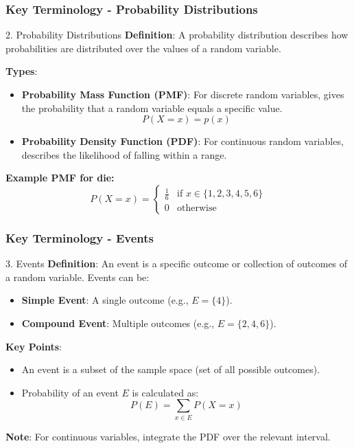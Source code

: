 \documentclass[aspectratio=169]{beamer}
\begin{document}
\begin{frame}[fragile]
  \frametitle{Key Terminology - Probability Distributions}
  \begin{block}{2. Probability Distributions}
    \textbf{Definition}: A probability distribution describes how probabilities are distributed over the values of a random variable.
  
    \textbf{Types}:
    \begin{itemize}
      \item \textbf{Probability Mass Function (PMF)}: For discrete random variables, gives the probability that a random variable equals a specific value.
      \begin{equation}
        P(X = x) = p(x)
      \end{equation}
      \item \textbf{Probability Density Function (PDF)}: For continuous random variables, describes the likelihood of falling within a range.
    \end{itemize}

    \textbf{Example PMF for die:}
    \begin{equation}
      P(X = x) = 
      \begin{cases}
        \frac{1}{6} & \text{if } x \in \{1, 2, 3, 4, 5, 6\} \\
        0 & \text{otherwise}
      \end{cases}
    \end{equation}
  \end{block}
\end{frame}

\begin{frame}[fragile]
  \frametitle{Key Terminology - Events}
  \begin{block}{3. Events}
    \textbf{Definition}: An event is a specific outcome or collection of outcomes of a random variable. Events can be:
    \begin{itemize}
      \item \textbf{Simple Event}: A single outcome (e.g., $E = \{4\}$).
      \item \textbf{Compound Event}: Multiple outcomes (e.g., $E = \{2, 4, 6\}$).
    \end{itemize}
    
    \textbf{Key Points}:
    \begin{itemize}
      \item An event is a subset of the sample space (set of all possible outcomes).
      \item Probability of an event $E$ is calculated as:
      \begin{equation}
        P(E) = \sum_{x \in E} P(X = x)
      \end{equation}
    \end{itemize}

    \textbf{Note}: For continuous variables, integrate the PDF over the relevant interval.
  \end{block}
\end{frame}
\end{document}
